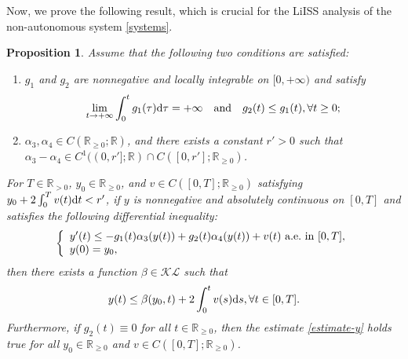 \documentclass[onecolumn]{autart}
\newtheorem{proposition}{Proposition}
\newenvironment{proof of Prop.ODE}{{\it Proof of Proposition~\ref{Prop.ODE}:\enspace}}{\hfill $\blacksquare$\par}
\newenvironment{proof of PDE}{{\it Proof of Proposition \ref{Prop.8}:\enspace}}{\hfill $\blacksquare$\par}
\begin{document}
{Now, we prove the following result, which is crucial for the LiISS analysis of the non-autonomous system \eqref{systems}.
\begin{proposition}\label{lemma 2.4}
	Assume that the following two conditions are satisfied:
	\begin{enumerate}
		\item[(i)] $g_1$ and $g_2$ are nonnegative and locally integrable on $[0,+\infty)$ and satisfy  \begin{align*}
			\lim\limits_{t\rightarrow +\infty}\int_0^tg_1(\tau){\rm{d}}\tau=+\infty \quad \text{and} \quad
			g_2(t)\leq g_1(t),\forall t\geq 0;
		\end{align*}
		\item[(ii)]   $\alpha_{3}  ,\alpha_4\in C(\mathbb{R}_{\geq 0};\mathbb{R})$, and there exists a  constant ${r'}>0$ such that
		$\alpha_3-\alpha_4\in  C^1((0,r'];\mathbb{R}) \cap C ([0,r'];\mathbb{R}_{\geq 0})$.%
	\end{enumerate}
	For $T\in \mathbb{R}_{>0}$,  $y_0\in \mathbb{R}_{\geq 0}$, and $v\in   C([0,T];\mathbb{R}_{\geq 0})$ satisfying $y_0+2\int_0^{T}v(t){\rm d}t< r'$, if $y$ is   nonnegative and absolutely continuous   on $[0,T]$  and satisfies the following differential inequality:
	\begin{equation}\label{ODE''}
		\left\{
		\begin{array}{ll}
			y'(t)\leq -g_1(t)\alpha_3(y(t))+g_2(t)\alpha_4(y(t))+v(t)  \  \text{a.e.\  in}\  [0,T],\\
			y(0)=y_0,
		\end{array}\\
		\right.
	\end{equation}
	then   there exists a function $\beta \in\mathcal{K}\mathcal{L}$   such that
	\begin{align}
		y(t)\leq \beta (y_0,t)+2\int_{0}^tv(s){\rm{d}}s, \forall t\in [0,T].\label{estimate-y}
	\end{align}
	Furthermore, if $g_2(t)\equiv 0$ for all $t\in \mathbb{R}_{\geq 0}$, then the estimate \eqref{estimate-y} holds  true for all $y_0\in \mathbb{R}_{\geq 0}$  and $v\in   C([0,T];\mathbb{R}_{\geq 0})$.
	

\end{proposition}}
\end{document}
